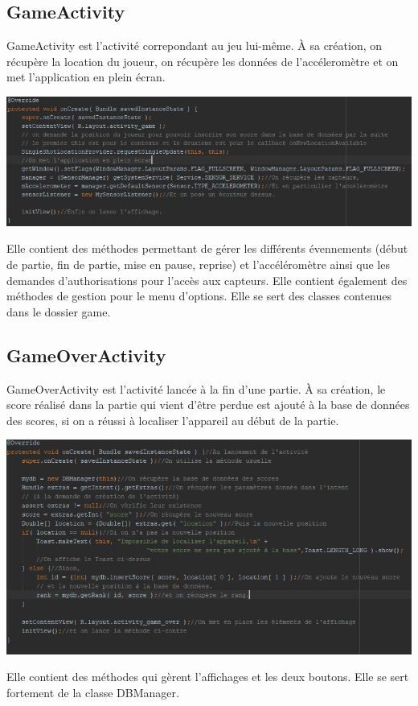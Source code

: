 \documentclass{article}
\begin{document}
\subsection{GameActivity}
\label{subsection:2_2}
GameActivity est l'activité correpondant au jeu lui-même.
\`A sa création, on récupère la location du joueur, on récupère les données de l'accéleromètre et on met l'application en plein écran.
\begin{center}
  \includegraphics[scale=0.5]{GameActivity_onCreate.png}
\end{center}
Elle contient des méthodes permettant de gérer les différents évennements (début de partie, fin de partie, mise en pause, reprise) et l'accéléromètre ainsi que les demandes d'authorisations pour l'accès aux capteurs.
Elle contient également des méthodes de gestion pour le menu d'options. Elle se sert des classes contenues dans le dossier game.

\subsection{GameOverActivity}
\label{subsection:2_3}
GameOverActivity est l'activité lancée à la fin d'une partie.
\`A sa création, le score réalisé dans la partie qui vient d'être perdue est ajouté à la base de données des scores, si on a réussi à localiser l'appareil au début de la partie.
\begin{center}
  \includegraphics[scale=0.5]{GameOverActivity_onCreate.png}
\end{center}
Elle contient des méthodes qui gèrent l'affichages et les deux boutons. Elle se sert fortement de la classe DBManager.
\end{document}
